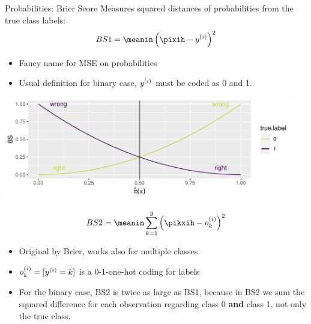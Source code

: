 \begin{vbframe}{Probabilities: Brier Score}
Measures squared distances of probabilities from the true class labels:
\[
BS1 = \meanin \left( \pixih - \yi \right)^2
\]


\begin{itemize}
  \item Fancy name for MSE on probabilities
  \item Usual definition for binary case, $y^{(i)}$ must be coded as 0 and 1.
\end{itemize}

\begin{knitrout}\scriptsize
{}\color{fgcolor}

{\centering \includegraphics[width=0.95\textwidth]{figure/eval_mclass_1} 

}



\end{knitrout}


\framebreak

\[
BS2 = \meanin \sumkg \left( \pikxih - o_k^{(i)} \right)^2
\]
\begin{itemize}
  \item Original by Brier, works also for multiple classes
  \item $ o_k^{(i)} = [ y^{(i)} = k ] $ is a 0-1-one-hot coding for labels
  \item For the binary case, BS2 is twice as large as BS1, because in BS2 we sum the squared
    difference for each observation regarding class 0 \textbf{and} class 1, not only the true class.
\end{itemize}


\end{vbframe}

